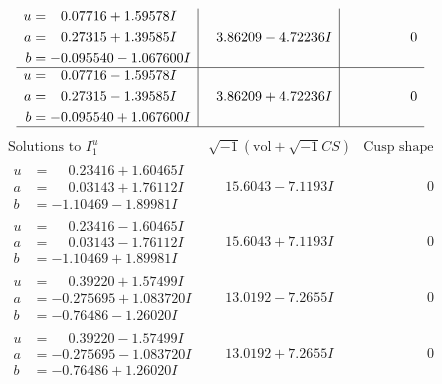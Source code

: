 \documentclass[1p]{elsarticle_modified}
\theoremstyle{definition}
\newcommand{\I}{\sqrt{-1}}
\begin{document}
$$\begin{array}{c|c|c}
\begin{aligned}
u &= \phantom{-}0.07716 + 1.59578 I \\
a &= \phantom{-}0.27315 + 1.39585 I \\
b &= -0.095540 - 1.067600 I\end{aligned}
 & \phantom{-}3.86209 - 4.72236 I & \phantom{-0.000000 } 0 \\ \hline\begin{aligned}
u &= \phantom{-}0.07716 - 1.59578 I \\
a &= \phantom{-}0.27315 - 1.39585 I \\
b &= -0.095540 + 1.067600 I\end{aligned}
 & \phantom{-}3.86209 + 4.72236 I & \phantom{-0.000000 } 0\\
 \hline 
 \end{array}$$\newpage$$\begin{array}{c|c|c}  
\text{Solutions to }I^u_{1}& \I (\text{vol} + \sqrt{-1}CS) & \text{Cusp shape}\\
 \hline 
\begin{aligned}
u &= \phantom{-}0.23416 + 1.60465 I \\
a &= \phantom{-}0.03143 + 1.76112 I \\
b &= -1.10469 - 1.89981 I\end{aligned}
 & \phantom{-}15.6043 - 7.1193 I & \phantom{-0.000000 } 0 \\ \hline\begin{aligned}
u &= \phantom{-}0.23416 - 1.60465 I \\
a &= \phantom{-}0.03143 - 1.76112 I \\
b &= -1.10469 + 1.89981 I\end{aligned}
 & \phantom{-}15.6043 + 7.1193 I & \phantom{-0.000000 } 0 \\ \hline\begin{aligned}
u &= \phantom{-}0.39220 + 1.57499 I \\
a &= -0.275695 + 1.083720 I \\
b &= -0.76486 - 1.26020 I\end{aligned}
 & \phantom{-}13.0192 - 7.2655 I & \phantom{-0.000000 } 0 \\ \hline\begin{aligned}
u &= \phantom{-}0.39220 - 1.57499 I \\
a &= -0.275695 - 1.083720 I \\
b &= -0.76486 + 1.26020 I\end{aligned}
 & \phantom{-}13.0192 + 7.2655 I & \phantom{-0.000000 } 0 \\ \hline\begin{aligned}

\end{aligned}
\end{array}$$
\end{document}

